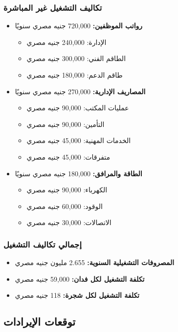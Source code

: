 \subsubsection{تكاليف التشغيل غير المباشرة}
\begin{itemize}
    \item \textbf{رواتب الموظفين:} 720,000 جنيه مصري سنويًا
    \begin{itemize}
        \item الإدارة: 240,000 جنيه مصري
        \item الطاقم الفني: 300,000 جنيه مصري
        \item طاقم الدعم: 180,000 جنيه مصري
    \end{itemize}
    
    \item \textbf{المصاريف الإدارية:} 270,000 جنيه مصري سنويًا
    \begin{itemize}
        \item عمليات المكتب: 90,000 جنيه مصري
        \item التأمين: 90,000 جنيه مصري
        \item الخدمات المهنية: 45,000 جنيه مصري
        \item متفرقات: 45,000 جنيه مصري
    \end{itemize}
    
    \item \textbf{الطاقة والمرافق:} 180,000 جنيه مصري سنويًا
    \begin{itemize}
        \item الكهرباء: 90,000 جنيه مصري
        \item الوقود: 60,000 جنيه مصري
        \item الاتصالات: 30,000 جنيه مصري
    \end{itemize}
\end{itemize}

\subsubsection{إجمالي تكاليف التشغيل}
\begin{itemize}
    \item \textbf{المصروفات التشغيلية السنوية:} 2.655 مليون جنيه مصري
    \item \textbf{تكلفة التشغيل لكل فدان:} 59,000 جنيه مصري
    \item \textbf{تكلفة التشغيل لكل شجرة:} 118 جنيه مصري
\end{itemize}

\subsection{توقعات الإيرادات}

